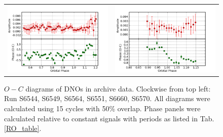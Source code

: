 \begin{figure}
\begin{narrow}{-1in}{0in}
\begin{tabular}{cc}
\includegraphics[width = 0.65\columnwidth, bb=0 0 600 400]{images/archive_phot/norm_int_eclipsing/S6570_22.63.png} &
\includegraphics[width = 0.65\columnwidth, bb=0 0 600 400]{images/archive_phot/norm_int_eclipsing/S6660d_FF_OC.png} 
\end{tabular}
\end{narrow}
\caption[$O-C$ diagrams of DNOs in archive data.]{$O-C$ diagrams of DNOs in archive data. Clockwise from top left: Run S6544, S6549, S6564, S6551, S6660, S6570. All diagrams were calculated using 15 cycles with 50\% overlap. Phase panels were calculated relative to constant signals with periods as listed in Tab. \ref{RO_table}.} 
\label{ec2117_archive_OC}


\end{figure}





